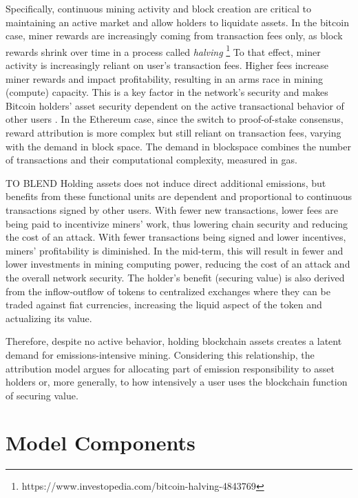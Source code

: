 \documentclass[11pt]{report}
\begin{document}
Specifically, continuous mining activity and block creation are critical to maintaining an active market and allow holders to liquidate assets. In the bitcoin case, miner rewards are increasingly coming from transaction fees only, as block rewards shrink over time in a process called \textit{halving} \footnote{https://www.investopedia.com/bitcoin-halving-4843769} To that effect, miner activity is increasingly reliant on user's transaction fees. Higher fees increase miner rewards and impact profitability, resulting in an arms race in mining (compute) capacity. This is a key factor in the network's security and makes Bitcoin holders' asset security dependent on the active transactional behavior of other users \cite{easleyMiningMarketsEvolution2019}. In the Ethereum case, since the switch to proof-of-stake consensus, reward attribution is more complex but still reliant on transaction fees, varying with the demand in block space. The demand in blockspace combines the number of transactions and their computational complexity, measured in gas.

TO BLEND
Holding assets does not induce direct additional emissions, but benefits from these functional units are dependent and proportional to continuous transactions signed by other users. With fewer new transactions, lower fees are being paid to incentivize miners' work, thus lowering chain security and reducing the cost of an attack. With fewer transactions being signed and lower incentives, miners' profitability is diminished.  In the mid-term, this will result in fewer and lower investments in mining computing power, reducing the cost of an attack and the overall network security. The holder's benefit (securing value) is also derived from the inflow-outflow of tokens to centralized exchanges where they can be traded against fiat currencies, increasing the liquid aspect of the token and actualizing its value. 

Therefore, despite no active behavior, holding blockchain assets creates a latent demand for emissions-intensive mining. Considering this relationship, the attribution model argues for allocating part of emission responsibility to asset holders or, more generally, to how intensively a user uses the blockchain function of securing value.

\section{Model Components}
\end{document}

